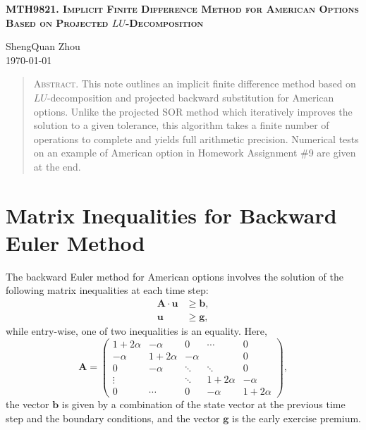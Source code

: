 \documentclass[paper=a4, fontsize=10pt,]{scrartcl} %
\theoremstyle{theorem}
\theoremstyle{remark}
\theoremstyle{example}
\numberwithin{equation}{section} %
\numberwithin{figure}{section} %
\numberwithin{table}{section} %
\begin{document}
	
\begin{center}
\scshape{}\selectfont \textsc{\textbf{ MTH9821. Implicit Finite Difference Method for American Options Based on Projected $LU$-Decomposition }}
\end{center}

\begin{center}
\footnotesize{ShengQuan Zhou}\\
\today
\end{center}


\begin{abstract}
   \textsc{Abstract}. This note outlines an implicit finite difference method based on $LU$-decomposition and projected backward substitution
   for American options.
   Unlike the projected SOR method which iteratively improves the solution to a given tolerance, this algorithm
    takes a finite number of operations to complete and yields full arithmetic precision. 
   Numerical tests on an example of American option in Homework Assignment \#9 are given at the end.
\end{abstract}


\section{Matrix Inequalities for Backward Euler Method}
The backward Euler method for American options involves the solution of the following matrix inequalities at each time step:
\begin{align}\label{ineq1}
\mathbf{A}\cdot\mathbf{u} &\ge \mathbf{b}, \\
\label{ineq11}\mathbf{u} &\ge \mathbf{g},
\end{align}
while entry-wise, one of two inequalities is an equality. Here, 
$$
\mathbf{A} = \begin{pmatrix}
1+2\alpha & -\alpha & 0 & \cdots & 0\\
-\alpha & 1+2\alpha & -\alpha &  & 0\\
0 & -\alpha &\ddots & \ddots & 0\\
\vdots & & \ddots & 1+2\alpha & -\alpha\\
0&\cdots & 0 &-\alpha & 1+2\alpha
\end{pmatrix},
$$
the vector $\mathbf{b}$ is given by a combination of the state vector at the previous time step and the boundary conditions, and
the vector $\mathbf{g}$ is the early exercise premium.\\
\end{document}
